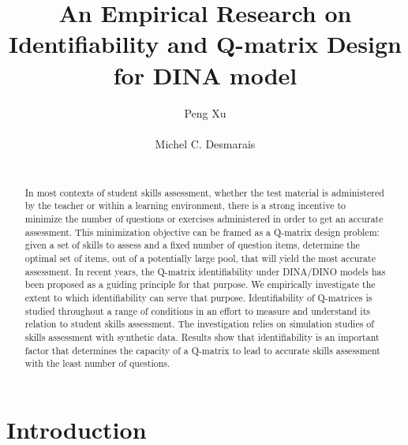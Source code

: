 \documentclass{edm_template}
\begin{document}
\title{An Empirical Research on Identifiability and Q-matrix Design for DINA model}
\author{
\alignauthor
Peng Xu\\
       \\
\alignauthor
Michel C. Desmarais\\
       \\
}
\maketitle

\begin{abstract}
In most contexts of student skills assessment, whether the test material is administered by the teacher or within a learning environment, there is a strong incentive to minimize the number of questions or exercises administered in order to get an accurate assessment.  This minimization objective can be framed as a Q-matrix design problem: given a set of skills to assess and a fixed number of question items, determine the optimal set of items, out of a potentially large pool, that will yield the most accurate assessment.  In recent years, the Q-matrix identifiability under DINA/DINO models has been proposed as a guiding principle for that purpose.  We empirically investigate the extent to which identifiability can serve that purpose. Identifiability of Q-matrices is studied throughout a range of conditions in an effort to measure and understand its relation to student skills assessment.  The investigation relies on simulation studies of skills assessment with synthetic data.  Results show that identifiability is an important factor that determines the capacity of a Q-matrix to lead to accurate skills assessment with the least number of questions.
\end{abstract}

\section{Introduction}

\end{document}
